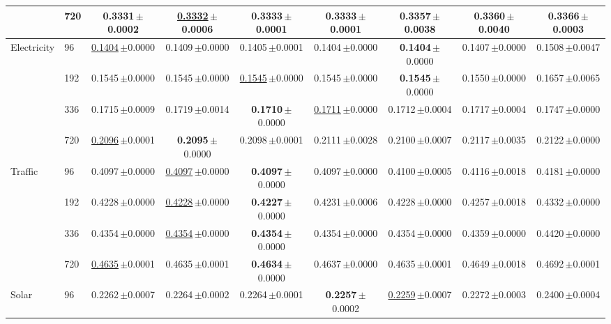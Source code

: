 \begin{tabular}{llccccccc}
 & 720 & \textbf{0.3331}\,{\tiny$\pm$0.0002} & \underline{0.3332}\,{\tiny$\pm$0.0006} & 0.3333\,{\tiny$\pm$0.0001} & 0.3333\,{\tiny$\pm$0.0001} & 0.3357\,{\tiny$\pm$0.0038} & 0.3360\,{\tiny$\pm$0.0040} & 0.3366\,{\tiny$\pm$0.0003} \\
\midrule
\multirow{4}{*}{Electricity} & 96 & \underline{0.1404}\,{\tiny$\pm$0.0000} & 0.1409\,{\tiny$\pm$0.0000} & 0.1405\,{\tiny$\pm$0.0001} & 0.1404\,{\tiny$\pm$0.0000} & \textbf{0.1404}\,{\tiny$\pm$0.0000} & 0.1407\,{\tiny$\pm$0.0000} & 0.1508\,{\tiny$\pm$0.0047} \\
 & 192 & 0.1545\,{\tiny$\pm$0.0000} & 0.1545\,{\tiny$\pm$0.0000} & \underline{0.1545}\,{\tiny$\pm$0.0000} & 0.1545\,{\tiny$\pm$0.0000} & \textbf{0.1545}\,{\tiny$\pm$0.0000} & 0.1550\,{\tiny$\pm$0.0000} & 0.1657\,{\tiny$\pm$0.0065} \\
 & 336 & 0.1715\,{\tiny$\pm$0.0009} & 0.1719\,{\tiny$\pm$0.0014} & \textbf{0.1710}\,{\tiny$\pm$0.0000} & \underline{0.1711}\,{\tiny$\pm$0.0000} & 0.1712\,{\tiny$\pm$0.0004} & 0.1717\,{\tiny$\pm$0.0004} & 0.1747\,{\tiny$\pm$0.0000} \\
 & 720 & \underline{0.2096}\,{\tiny$\pm$0.0001} & \textbf{0.2095}\,{\tiny$\pm$0.0000} & 0.2098\,{\tiny$\pm$0.0001} & 0.2111\,{\tiny$\pm$0.0028} & 0.2100\,{\tiny$\pm$0.0007} & 0.2117\,{\tiny$\pm$0.0035} & 0.2122\,{\tiny$\pm$0.0000} \\
\midrule
\multirow{4}{*}{Traffic} & 96 & 0.4097\,{\tiny$\pm$0.0000} & \underline{0.4097}\,{\tiny$\pm$0.0000} & \textbf{0.4097}\,{\tiny$\pm$0.0000} & 0.4097\,{\tiny$\pm$0.0000} & 0.4100\,{\tiny$\pm$0.0005} & 0.4116\,{\tiny$\pm$0.0018} & 0.4181\,{\tiny$\pm$0.0000} \\
 & 192 & 0.4228\,{\tiny$\pm$0.0000} & \underline{0.4228}\,{\tiny$\pm$0.0000} & \textbf{0.4227}\,{\tiny$\pm$0.0000} & 0.4231\,{\tiny$\pm$0.0006} & 0.4228\,{\tiny$\pm$0.0000} & 0.4257\,{\tiny$\pm$0.0018} & 0.4332\,{\tiny$\pm$0.0000} \\
 & 336 & 0.4354\,{\tiny$\pm$0.0000} & \underline{0.4354}\,{\tiny$\pm$0.0000} & \textbf{0.4354}\,{\tiny$\pm$0.0000} & 0.4354\,{\tiny$\pm$0.0000} & 0.4354\,{\tiny$\pm$0.0000} & 0.4359\,{\tiny$\pm$0.0000} & 0.4420\,{\tiny$\pm$0.0000} \\
 & 720 & \underline{0.4635}\,{\tiny$\pm$0.0001} & 0.4635\,{\tiny$\pm$0.0001} & \textbf{0.4634}\,{\tiny$\pm$0.0000} & 0.4637\,{\tiny$\pm$0.0000} & 0.4635\,{\tiny$\pm$0.0001} & 0.4649\,{\tiny$\pm$0.0018} & 0.4692\,{\tiny$\pm$0.0001} \\
\midrule
\multirow{4}{*}{Solar} & 96 & 0.2262\,{\tiny$\pm$0.0007} & 0.2264\,{\tiny$\pm$0.0002} & 0.2264\,{\tiny$\pm$0.0001} & \textbf{0.2257}\,{\tiny$\pm$0.0002} & \underline{0.2259}\,{\tiny$\pm$0.0007} & 0.2272\,{\tiny$\pm$0.0003} & 0.2400\,{\tiny$\pm$0.0004} \\

\end{tabular}
